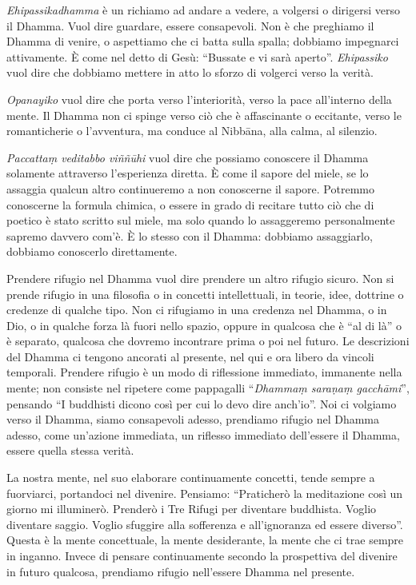 \emph{Ehipassikadhamma} è un richiamo ad andare a vedere, a volgersi o
dirigersi verso il Dhamma. Vuol dire guardare, essere consapevoli. Non è
che preghiamo il Dhamma di venire, o aspettiamo che ci batta sulla
spalla; dobbiamo impegnarci attivamente. È come nel detto di Gesù:
``Bussate e vi sarà aperto''. \emph{Ehipassiko} vuol dire che dobbiamo
mettere in atto lo sforzo di volgerci verso la verità.

\emph{Opanayiko} vuol dire che porta verso l'interiorità, verso la pace
all'interno della mente. Il Dhamma non ci spinge verso ciò che è
affascinante o eccitante, verso le romanticherie o l'avventura, ma
conduce al Nibbāna, alla calma, al silenzio.

\emph{Paccattaṃ veditabbo viññūhi} vuol dire che possiamo conoscere il
Dhamma solamente attraverso l'esperienza diretta. È come il sapore del
miele, se lo assaggia qualcun altro continueremo a non conoscerne il
sapore. Potremmo conoscerne la formula chimica, o essere in grado di
recitare tutto ciò che di poetico è stato scritto sul miele, ma solo
quando lo assaggeremo personalmente sapremo davvero com'è. È lo stesso
con il Dhamma: dobbiamo assaggiarlo, dobbiamo conoscerlo direttamente.

Prendere rifugio nel Dhamma vuol dire prendere un altro rifugio sicuro.
Non si prende rifugio in una filosofia o in concetti intellettuali, in
teorie, idee, dottrine o credenze di qualche tipo. Non ci rifugiamo in
una credenza nel Dhamma, o in Dio, o in qualche forza là fuori nello
spazio, oppure in qualcosa che è ``al di là'' o è separato, qualcosa che
dovremo incontrare prima o poi nel futuro. Le descrizioni del Dhamma ci
tengono ancorati al presente, nel qui e ora libero da vincoli temporali.
Prendere rifugio è un modo di riflessione immediato, immanente nella
mente; non consiste nel ripetere come pappagalli ``\emph{Dhammaṃ saraṇaṃ
gacchāmi}'', pensando ``I buddhisti dicono così per cui lo devo dire
anch'io''. Noi ci volgiamo verso il Dhamma, siamo consapevoli adesso,
prendiamo rifugio nel Dhamma adesso, come un'azione immediata, un
riflesso immediato dell'essere il Dhamma, essere quella stessa verità.

La nostra mente, nel suo elaborare continuamente concetti, tende sempre
a fuorviarci, portandoci nel divenire. Pensiamo: ``Praticherò la
meditazione così un giorno mi illuminerò. Prenderò i Tre Rifugi per
diventare buddhista. Voglio diventare saggio. Voglio sfuggire alla
sofferenza e all'ignoranza ed essere diverso''. Questa è la mente
concettuale, la mente desiderante, la mente che ci trae sempre in
inganno. Invece di pensare continuamente secondo la prospettiva del
divenire in futuro qualcosa, prendiamo rifugio nell'essere Dhamma nel
presente.

